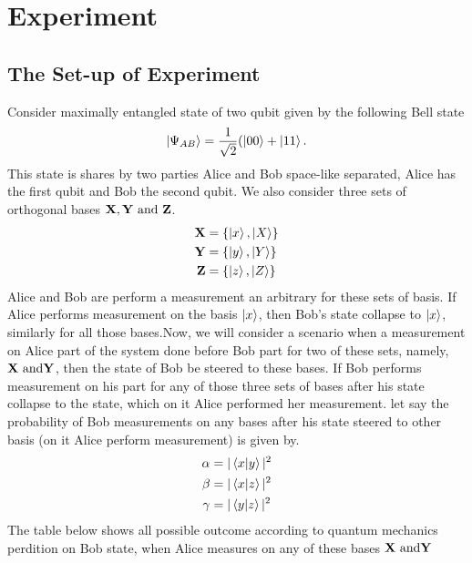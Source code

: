 \section{Experiment}\hfill \break
\subsection{The Set-up of Experiment}\hfill \break
Consider maximally entangled state of two qubit given by the following Bell state
\begin{align*}
\ket{\Psi_{AB}}=\frac{1}{\sqrt{2}}(\ket{00}+\ket{11}.
\end{align*}
This state is shares by two parties Alice and Bob space-like separated, Alice has the first qubit and Bob the second qubit.
We also consider  three sets of orthogonal bases $\bf{X}, \bf{Y} \text{ and } \bf{Z}$.
\begin{align}
 \bf{X}&=\{\ket{x},\ket{X}\}\\
 \bf{Y}&=\{\ket{y},\ket{Y}\}\\
  \bf{Z}&=\{\ket{z},\ket{Z}\}
\end{align}
Alice and Bob are perform a measurement an arbitrary for these sets of basis. If Alice  performs measurement on the basis $\ket{x}$, then Bob's state collapse to $\ket{x}$, similarly for all  those bases.Now, we will consider a scenario when a measurement on Alice part of the system  done before Bob part for two of these sets, namely, $\bf{X} \text{ and} \bf{Y} $, then the state of Bob be steered to these bases. If Bob performs measurement on his part for any of those three sets of bases after his state collapse to the state, which on it Alice performed her measurement.
let say the probability of Bob measurements on any bases after his state steered to other basis (on it Alice perform measurement) is given by.
\begin{align*}
\alpha &=|\bra{x}\ket{y}|^2\\
\beta &=|\bra{x}\ket{z}|^2\\
\gamma& =|\bra{y}\ket{z}|^2
\end{align*}
The table below shows all possible outcome according to quantum mechanics perdition  on Bob state, when Alice measures on  any of these bases $\bf{X} \text{ and} \bf{Y} $



